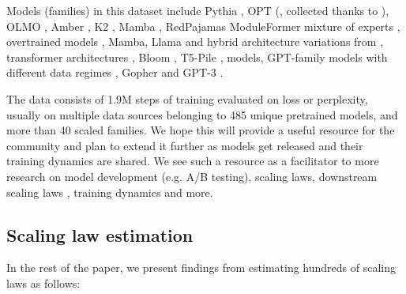 \documentclass{article}
\theoremstyle{plain}
\theoremstyle{definition}
\theoremstyle{remark}
\begin{document}
Models (families) in this dataset include Pythia \citep{pythia}%
, OPT (\citealp{zhang2022optopenpretrainedtransformer}, collected thanks to \citealp{xia2023training,pythia}), OLMO \citep{groeneveld2024olmoacceleratingsciencelanguage}, Amber \citep{liu2023llm360}, K2 \citep{k2}, Mamba \citep{liu2023llm360}, RedPajamas\citep{Together_2023}%
ModuleFormer mixture of experts \citep{shen2023moduleformer}, overtrained models \citep{overtrain}, Mamba, Llama and hybrid architecture variations from \citet{poli2024mechanisticdesignscalinghybrid}, transformer architectures \citep{alabdulmohsin2022revisiting}, Bloom 
\citep{le2023bloom}, T5-Pile \citep{2024PileT5}, \citet{pandey2024gzip} models, GPT-family models with different data regimes \citep{datablations}, Gopher \citep{hoffmann2022training} and GPT-3 \citep{brown2020languagemodelsfewshotlearners}. 

The data consists of 1.9M steps of training evaluated on loss or perplexity, usually on multiple data sources belonging to 485 unique pretrained models, and more than 40 scaled families. %
We hope this will provide a useful resource for the community and plan to extend it further as models get released and their training dynamics are shared. We see such a resource as a facilitator to more research on model development (e.g. A/B testing), scaling laws, downstream scaling laws \citep{overtrain,ruan2024observational,owen2024predictable,isik2024scaling}, training dynamics \citep{trajectories} and more.

\subsection{Scaling law estimation}
In the rest of the paper, we present findings from estimating hundreds of scaling laws as follows:
\end{document}

